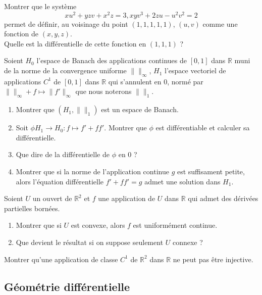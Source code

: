 \begin{exer}
Montrer que le système 
\[xu^2 + yzv + x^2 z = 3 , xyv^3 + 2zu - u^2 v^2 = 2\]
permet de définir, au voisinage du point $(1,1,1,1,1)$, $(u,v)$ comme une fonction de $(x,y,z)$.\\
Quelle est la différentielle de cette fonction en $(1,1,1)$ ?
\end{exer}

\begin{exer}
Soient $H_0$ l'espace de Banach des applications continues de $[0,1]$ dans $\mathbb{R}$ %
muni de la norme de la convergence uniforme $\| \|_{\infty}$, %
$H_1$ l'espace vectoriel de applications $C^1$ de $[0,1]$ dans $\mathbb{R}$ %
qui s'annulent en $0$, normé par $\| \|_{\infty} + f \mapsto \| f' \|_{\infty}$ que nous noterons $\| \|_1$.
\begin{enumerate}
\item Montrer que $(H_1 , \| \|_1)$ est un espace de Banach.
\item Soit $\phi H_1 \rightarrow H_0 : f \mapsto f' + ff'$. Montrer que $\phi$ est différentiable et calculer sa différentielle.
\item Que dire de la différentielle de $\phi$ en $0$ ?
\item Montrer que si la norme de l'application continue $g$ est suffisament petite, %
alors l'\'equation différentielle $f' + ff' = g$ admet une solution dans $H_1$.
\end{enumerate}
\end{exer}

\begin{exer}
Soient $U$ un ouvert de $\mathbb{R}^2$ et $f$ une application de $U$ dans $\mathbb{R}$  %
qui admet des dérivées partielles bornées.
\begin{enumerate}
\item Montrer que si $U$ est convexe, alors $f$ est uniformément continue.
\item Que devient le résultat si on suppose seulement $U$ connexe ?
\end{enumerate}
\end{exer}

\begin{exer}
Montrer qu'une application de classe $C^1$ de $\mathbb{R}^2$ dans $\mathbb{R}$ ne peut pas être injective.
\end{exer}

\subsection{G\'eom\'etrie diff\'erentielle}

